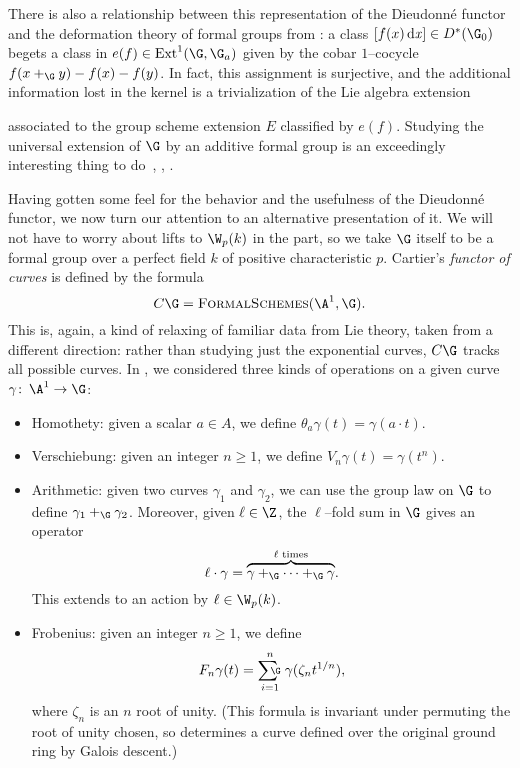 \begin{remark}\label{ExtensionsPresentationOfDieudonne}
There is also a relationship between this representation of the Dieudonn\'e functor and the deformation theory of formal groups from : a class \([f(x)\dx] \in D^*(\G_0)\) begets a class in \(e(f) \in \Ext^1(\G, \G_a)\) given by the cobar \(1\)--cocycle \(f(x +_{\G} y) - f(x) - f(y)\).  In fact, this assignment is surjective, and the additional information lost in the kernel is a trivialization of the Lie algebra extension
\begin{center}
\end{center}
associated to the group scheme extension \(E\) classified by \(e(f)\).  Studying the universal extension of \(\G\) by an additive formal group is an exceedingly interesting thing to do~\cite[Section V.4]{GrothendieckCristaux}, \cite{MazurMessing}, \cite[Section 11]{HopkinsGrossEquivVBs}.
\end{remark}

Having gotten some feel for the behavior and the usefulness of the Dieudonn\'e functor, we now turn our attention to an alternative presentation of it.  We will not have to worry about lifts to \(\W_p(k)\) in the part, so we take \(\G\) itself to be a formal group over a perfect field \(k\) of positive characteristic \(p\).  Cartier's \textit{functor of curves} is defined by the formula \[C\G = \CatOf{FormalSchemes}(\A^1, \G).\]  This is, again, a kind of relaxing of familiar data from Lie theory, taken from a different direction: rather than studying just the exponential curves, \(C\G\) tracks all possible curves.  In , we considered three kinds of operations on a given curve \(\gamma\co \A^1 \to \G\):
\begin{itemize}
\item {}Homothety: given a scalar \(a \in A\), we define \(\theta_a \gamma(t) = \gamma(a \cdot t)\).
\item {}Verschiebung: given an integer \(n \ge 1\), we define \(V_n \gamma(t) = \gamma(t^n)\).
\item {}Arithmetic: given two curves \(\gamma_1\) and \(\gamma_2\), we can use the group law on \(\G\) to define \(\gamma_1 +_{\G} \gamma_2\).  Moreover, given \(\ell \in \Z\), the \(\ell\)--fold sum in \(\G\) gives an operator \[\ell \cdot \gamma = \overset{\text{\(\ell\) times}}{\overbrace{\gamma +_{\G} \cdots +_{\G} \gamma}}.\]  This extends to an action by \(\ell \in \W_p(k)\).
\item {}Frobenius: given an integer \(n \ge 1\), we define \[F_n \gamma(t) = \sumG_{i=1}^n \gamma(\zeta_n t^{1/n}),\] where \(\zeta_{n}\) is an \(n\){\th} root of unity.  (This formula is invariant under permuting the root of unity chosen, so determines a curve defined over the original ground ring by Galois descent.)
\end{itemize}

